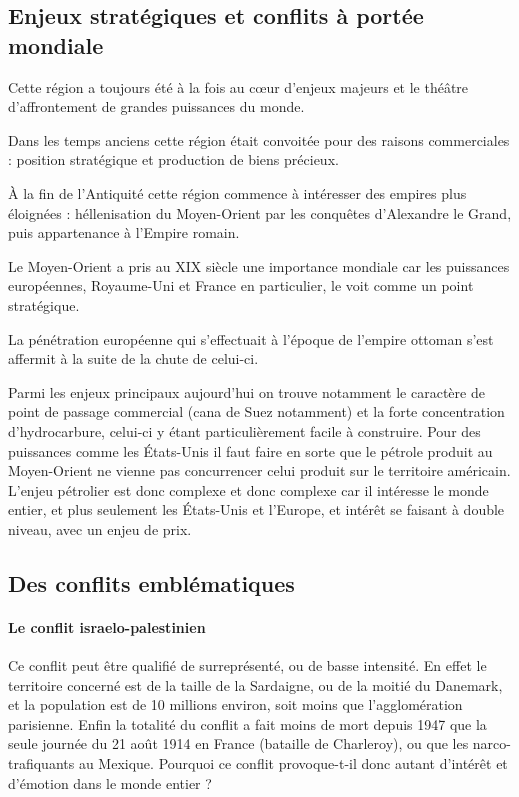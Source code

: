 \documentclass[a4paper,10pt]{article}
\begin{document}
	\subsection{Enjeux stratégiques et conflits à portée mondiale}

		Cette région a toujours été à la fois au cœur d'enjeux majeurs et le théâtre d'affrontement de grandes puissances du monde.

		Dans les temps anciens cette région était convoitée pour des raisons commerciales : position stratégique et production de biens précieux.

		À la fin de l'Antiquité cette région commence à intéresser des empires plus éloignées : héllenisation du Moyen-Orient par les conquêtes d'Alexandre le Grand, puis appartenance à l'Empire romain.

		Le Moyen-Orient a pris au XIX siècle une importance mondiale car les puissances européennes, Royaume-Uni et France en particulier, le voit comme un point stratégique.

		La pénétration européenne qui s'effectuait à l'époque de l'empire ottoman s'est affermit à la suite de la chute de celui-ci.

		Parmi les enjeux principaux aujourd'hui on trouve notamment le caractère de point de passage commercial (cana de Suez notamment) et la forte concentration d'hydrocarbure, celui-ci y étant particulièrement facile à construire.
		Pour des puissances comme les États-Unis il faut faire en sorte que le pétrole produit au Moyen-Orient ne vienne pas concurrencer celui produit sur le territoire américain.
		L'enjeu pétrolier est donc complexe et donc complexe car il intéresse le monde entier, et plus seulement les États-Unis et l'Europe, et intérêt se faisant à double niveau, avec un enjeu de prix.

	\subsection{Des conflits emblématiques}

		\paragraph{Le conflit israelo-palestinien}

		Ce conflit peut être qualifié de surreprésenté, ou de basse intensité.
		En effet le territoire concerné est de la taille de la Sardaigne, ou de la moitié du Danemark, et la population est de 10 millions environ, soit moins que l'agglomération parisienne.
		Enfin la totalité du conflit a fait moins de mort depuis 1947 que la seule journée du 21 août 1914 en France (bataille de Charleroy), ou que les narco-trafiquants au Mexique.
		Pourquoi ce conflit provoque-t-il donc autant d'intérêt et d'émotion dans le monde entier ?
\end{document}
